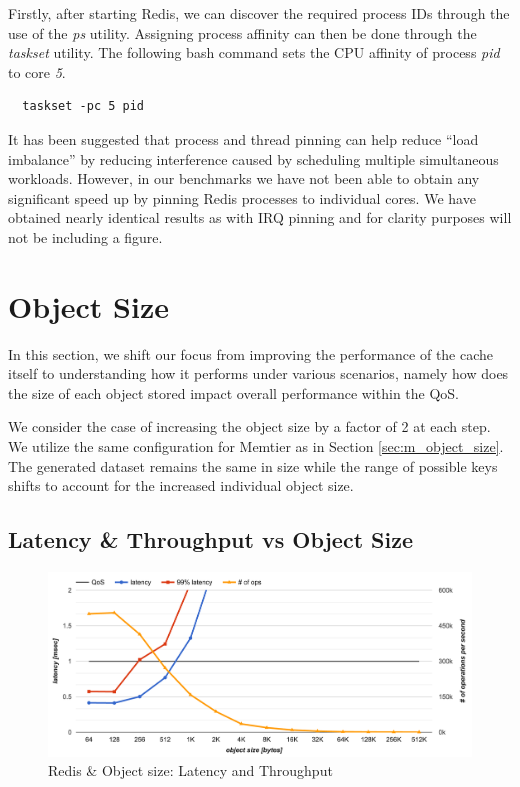 Firstly, after starting Redis, we can discover the required process IDs through the use of the \textit{ps} utility. Assigning process affinity can then be done through the \textit{taskset} utility. The following bash command sets the CPU affinity of process \textit{pid} to core \textit{5}.

\begin{lstlisting}
  taskset -pc 5 pid
\end{lstlisting}

It has been suggested that process and thread pinning can help reduce ``load imbalance'' \cite{leverich2014reconciling} by reducing interference caused by scheduling multiple simultaneous workloads. However, in our benchmarks we have not been able to obtain any significant speed up by pinning Redis processes to individual cores. We have obtained nearly identical results as with IRQ pinning and for clarity purposes will not be including a figure.

\section{Object Size}
In this section, we shift our focus from improving the performance of the cache itself to understanding how it performs under various scenarios, namely how does the size of each object stored impact overall performance within the QoS.

We consider the case of increasing the object size by a factor of 2 at each step. We utilize the same configuration for Memtier as in Section \ref{sec:m_object_size}. The generated dataset remains the same in size while the range of possible keys shifts to account for the increased individual object size.

\subsection{Latency \& Throughput vs Object Size}
\begin{figure}[h]
    \includegraphics[width=\textwidth]{./res2/r_object_size_latency.png}
    \caption{Redis \& Object size: Latency and Throughput}
    \label{fig:r_object_size_latency}
\end{figure}

